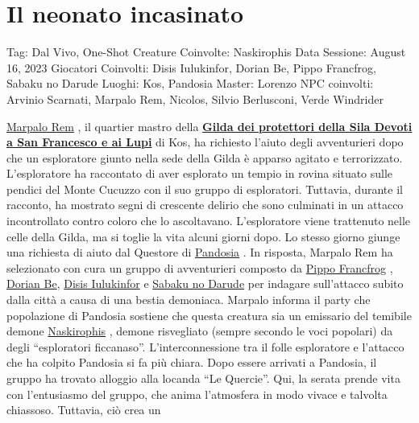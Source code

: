 \section{Il neonato incasinato}\label{il-neonato-incasinato}

Tag: Dal Vivo, One-Shot Creature Coinvolte: Naskirophis Data Sessione:
August 16, 2023 Giocatori Coinvolti: Disis Iulukinfor, Dorian Be, Pippo
Francfrog, Sabaku no Darude Luoghi: Kos, Pandosia Master: Lorenzo NPC
coinvolti: Arvinio Scarnati, Marpalo Rem, Nicolos, Silvio Berlusconi,
Verde Windrider

\href{Marpalo\%20Rem\%202582afbe3ba04b1ea86091e6d1f4e6ca.md}{Marpalo
Rem} , il quartier mastro della
\href{Gilda\%20dei\%20protettori\%20della\%20Sila\%20Devoti\%20a\%20San\%20Franc\%20e29bb7909af24fee931336355db913d4.md}{\textbf{Gilda
dei protettori della Sila Devoti a San Francesco e ai Lupi}} di Kos, ha
richiesto l'aiuto degli avventurieri dopo che un esploratore giunto
nella sede della Gilda è apparso agitato e terrorizzato. L'esploratore
ha raccontato di aver esplorato un tempio in rovina situato sulle
pendici del Monte Cucuzzo con il suo gruppo di esploratori. Tuttavia,
durante il racconto, ha mostrato segni di crescente delirio che sono
culminati in un attacco incontrollato contro coloro che lo ascoltavano.
L'esploratore viene trattenuto nelle celle della Gilda, ma si toglie la
vita alcuni giorni dopo. Lo stesso giorno giunge una richiesta di aiuto
dal Questore di
\href{Pandosia\%2028129d9d5ac7448d98387dc4262c4704.md}{Pandosia} . In
risposta, Marpalo Rem ha selezionato con cura un gruppo di avventurieri
composto da
\href{Pippo\%20Francfrog\%204d15378e582d4f1db815d957fe064245.md}{Pippo
Francfrog} ,
\href{Dorian\%20Be\%20af030367f8054333912b2dca0de16d6f.md}{Dorian Be},
\href{Disis\%20Iulukinfor\%20e7699726707a41be926c823d67941f78.md}{Disis
Iulukinfor} e
\href{Sabaku\%20no\%20Darude\%209c414f3e551144f4acee665cab478336.md}{Sabaku
no Darude} per indagare sull'attacco subito dalla città a causa di una
bestia demoniaca. Marpalo informa il party che popolazione di Pandosia
sostiene che questa creatura sia un emissario del temibile demone
\href{Naskirophis\%20120e02c652b84f2abeac36fef59c28f6.md}{Naskirophis} ,
demone risvegliato (sempre secondo le voci popolari) da degli
``esploratori ficcanaso''. L'interconnessione tra il folle esploratore e
l'attacco che ha colpito Pandosia si fa più chiara. Dopo essere arrivati
a Pandosia, il gruppo ha trovato alloggio alla locanda ``Le Quercie''.
Qui, la serata prende vita con l'entusiasmo del gruppo, che anima
l'atmosfera in modo vivace e talvolta chiassoso. Tuttavia, ciò crea un

